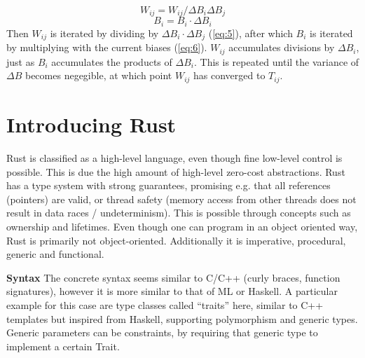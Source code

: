 \newpage
\begin{equation}\label{eq:5}
    W_{ij} = W_{ij} / \Delta B_i \Delta B_j
\end{equation}
\begin{equation}\label{eq:6}
    B_i = B_i \cdot \Delta B_i
\end{equation}
Then $W_{ij}$ is iterated by dividing by $\Delta B_i \cdot \Delta B_j$
(\eqref{eq:5}), after which $B_i$ is iterated by multiplying with the current
biases (\eqref{eq:6}). $W_{ij}$ accumulates divisions by $\Delta B_i$, just as
$B_i$ accumulates the products of $\Delta B_i$. This is repeated until the
variance of $\Delta B$ becomes negegible, at which point $W_{ij}$ has converged
to $T_{ij}$.






\section{Introducing Rust}\label{sec:Rust}


Rust is classified as a high-level language, even though fine low-level control
is possible. This is due the high amount of high-level zero-cost abstractions.
Rust has a type system with strong guarantees, promising e.g. that all
references (pointers) are valid, or thread safety (memory access from other
threads does not result in data races / undeterminism). This is possible
through concepts such as ownership and lifetimes. Even though one can program
in an object oriented way, Rust is primarily not object-oriented. Additionally
it is imperative, procedural, generic and functional.

\textbf{Syntax}\label{sec:syntax}
The concrete syntax seems similar to C/C++ (curly braces, function signatures),
however it is more similar to that of ML or Haskell. A particular example for
this case are type classes called ``traits'' here, similar to C++ templates but
inspired from Haskell, supporting polymorphism and generic types. Generic
parameters can be constraints, by requiring that generic type to implement a
certain Trait.

